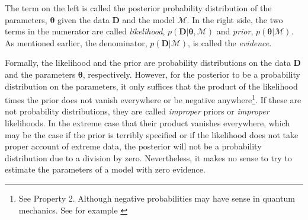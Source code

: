The term on the left is called the posterior probability distribution of the parameters, $\mathbf{\theta}$ given the data $\mathbf{D}$ and the model $\mathcal{M}$. In the right side, the two terms in the numerator are called \emph{likelihood}, $p(\mathbf{D}|\mathbf{\theta},\mathcal{M})$ and \emph{prior}, $p(\mathbf{\theta}|\mathcal{M})$. As mentioned earlier, the denominator, $p(\mathbf{D}|\mathcal{M})$, is called the \emph{evidence}. 

Formally, the likelihood and the prior are probability distributions on the data $\mathbf{D}$ and the parameters $\mathbf{\theta}$, respectively. However, for the posterior to be a probability distribution on the parameters, it only suffices that the product of the likelihood times the prior does not vanish everywhere or be negative anywhere\footnote{See Property 2. Although negative probabilities may have sense in quantum mechanics. See for example \citet{1942RSPSA.180....1D}}. If these are not probability distributions, they are called \emph{improper} priors or \emph{improper} likelihoods. In the extreme case that their product vanishes everywhere, which may be the case if the prior is terribly specified or if the likelihood does not take proper account of extreme data, the posterior will not be a probability distribution due to a division by zero. Nevertheless, it makes no sense to try to estimate the parameters of a model with zero evidence.

%

